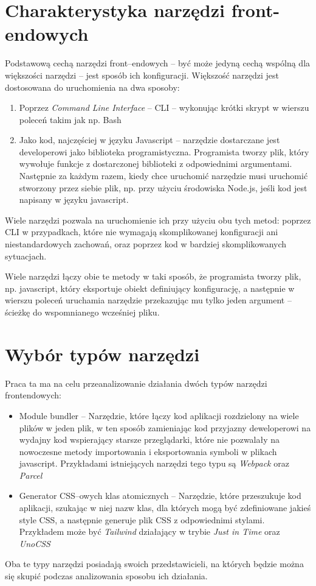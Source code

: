 \documentclass{SGGW-thesis}
\begin{document}
\section{Charakterystyka narzędzi front-endowych}
Podstawową cechą narzędzi front--endowych -- być może jedyną cechą wspólną dla większości narzędzi -- jest sposób ich konfiguracji. Większość narzędzi jest dostosowana do uruchomienia na dwa sposoby:
\begin{enumerate}
    \item Poprzez \emph{Command Line Interface} -- CLI -- wykonując krótki skrypt w wierszu poleceń takim jak np. Bash
    \item Jako kod, najczęściej w języku Javascript -- narzędzie dostarczane jest developerowi jako biblioteka programistyczna. Programista tworzy plik, który wywołuje funkcje z dostarczonej biblioteki z odpowiednimi argumentami. Następnie za każdym razem, kiedy chce uruchomić narzędzie musi uruchomić stworzony przez siebie plik, np. przy użyciu środowiska Node.js, jeśli kod jest napisany w języku javascript.
\end{enumerate}
Wiele narzędzi pozwala na uruchomienie ich przy użyciu obu tych metod: poprzez CLI w przypadkach, które nie wymagają skomplikowanej konfiguracji ani niestandardowych zachowań, oraz poprzez kod w bardziej skomplikowanych sytuacjach.

Wiele narzędzi łączy obie te metody w taki sposób, że programista tworzy plik, np. javascript, który eksportuje obiekt definiujący konfigurację, a następnie w wierszu poleceń uruchamia narzędzie przekazując mu tylko jeden argument -- ścieżkę do wspomnianego wcześniej pliku.

\section{Wybór typów narzędzi}
Praca ta ma na celu przeanalizowanie działania dwóch typów narzędzi frontendowych:
\begin{itemize}
    \item Module bundler -- Narzędzie, które łączy kod aplikacji rozdzielony na wiele plików w jeden plik, w ten sposób zamieniając kod przyjazny deweloperowi na wydajny kod wspierający starsze przeglądarki, które nie pozwalały na nowoczesne metody importowania i eksportowania symboli w plikach javascript. Przykładami istniejących narzędzi tego typu są \emph{Webpack} oraz \emph{Parcel}
    \item Generator CSS--owych klas atomicznych -- Narzędzie, które przeszukuje kod aplikacji, szukając w niej nazw klas, dla których mogą być zdefiniowane jakieś style CSS, a następnie generuje plik CSS z odpowiednimi stylami. Przykładem może być \emph{Tailwind\cite{Tailwind_jit}} działający w trybie \emph{Just in Time} oraz \emph{UnoCSS\cite{unocss}}
\end{itemize}
Oba te typy narzędzi posiadają swoich przedstawicieli, na których będzie można się skupić podczas analizowania sposobu ich działania.
\end{document}
